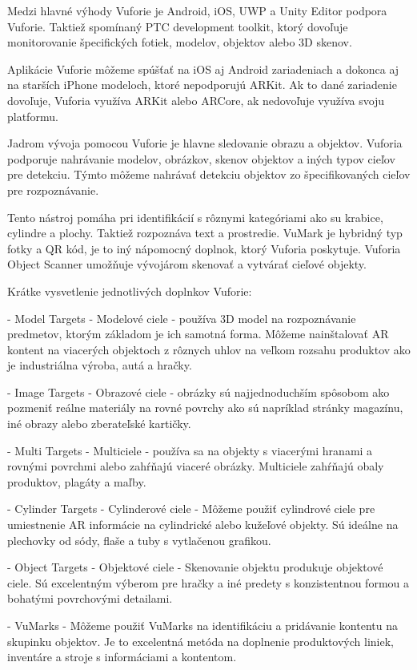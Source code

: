 Medzi hlavné výhody Vuforie je Android, iOS, UWP a Unity Editor podpora Vuforie. Taktiež spomínaný PTC development toolkit, ktorý dovoľuje monitorovanie špecifických fotiek, modelov, objektov alebo 3D skenov.

Aplikácie Vuforie môžeme spúšťať na iOS aj Android zariadeniach a dokonca aj na starších iPhone modeloch, ktoré nepodporujú ARKit. Ak to dané zariadenie dovoľuje, Vuforia využíva ARKit alebo ARCore, ak nedovoľuje využíva svoju platformu.

Jadrom vývoja pomocou Vuforie je hlavne sledovanie obrazu a objektov. Vuforia podporuje nahrávanie modelov, obrázkov, skenov objektov a iných typov cieľov pre detekciu. Týmto môžeme nahrávať detekciu objektov zo špecifikovaných cieľov pre rozpoznávanie.

Tento nástroj pomáha pri identifikácií s rôznymi kategóriami ako su krabice, cylindre a plochy. Taktiež rozpoznáva text a prostredie. VuMark je hybridný typ fotky a QR kód, je to iný nápomocný doplnok, ktorý Vuforia poskytuje. Vuforia Object Scanner umožňuje vývojárom skenovať a vytvárať cieľové objekty. 

Krátke vysvetlenie jednotlivých doplnkov Vuforie:

- Model Targets - Modelové ciele - používa 3D model na rozpoznávanie predmetov, ktorým základom je ich samotná forma. Môžeme nainštalovať AR kontent na viacerých objektoch z rôznych uhlov na veľkom rozsahu produktov ako je industriálna výroba, autá a hračky.

- Image Targets - Obrazové ciele - obrázky sú najjednoduchším spôsobom ako pozmeniť reálne materiály na rovné povrchy ako sú napríklad stránky magazínu, iné obrazy alebo zberateľské kartičky.

- Multi Targets - Multiciele - používa sa na objekty s viacerými hranami a rovnými povrchmi alebo zahŕňajú viaceré obrázky. Multiciele zahŕňajú obaly produktov, plagáty a maľby.

- Cylinder Targets - Cylinderové ciele -  Môžeme použiť cylindrové ciele pre umiestnenie AR informácie na cylindrické alebo kužeľové objekty. Sú ideálne na plechovky od sódy, flaše a tuby s vytlačenou grafikou.

- Object Targets - Objektové ciele - Skenovanie objektu produkuje objektové ciele. Sú excelentným výberom pre hračky a iné predety s konzistentnou formou a bohatými povrchovými detailami. 

- VuMarks - Môžeme použiť VuMarks na identifikáciu a pridávanie kontentu na skupinku objektov. Je to excelentná metóda na doplnenie produktových liniek, inventáre a stroje s informáciami a kontentom.

